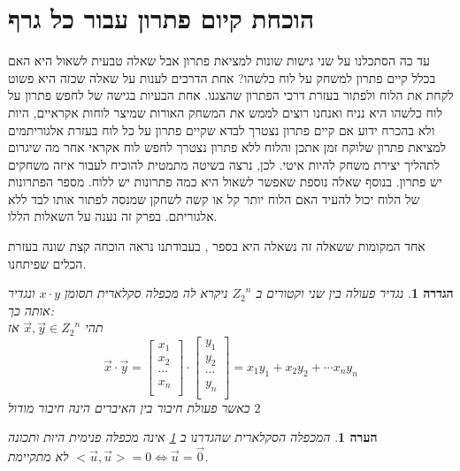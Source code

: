 \documentclass[12pt,twoside]{article}
\newtheorem{definition}{הגדרה}[section]
\newtheorem{comm}{הערה}[section]
\newcommand{\Zn}{{Z_2}^n}
\begin{document}
\section{הוכחת  קיום פתרון עבור כל גרף}
עד כה הסתכלנו על שני גישות שונות למציאת פתרון
אבל שאלה טבעית לשאול היא האם בכלל קיים פתרון למשחק על לוח כלשהו?
אחת הדרכים לענות על שאלה שכזה היא פשוט לקחת את הלוח ולפתור בעזרת 
דרכי הפתרון שהצגנו.
אחת הבעיות בגישה של לחפש פתרון על לוח כלשהו היא 
נניח ואנחנו רוצים לממש את המשחק האורות שמיצר לוחות אקראיים, היות ולא בהכרח ידוע אם קיים פתרון 
נצטרך לבדא שקיים פתרון על כל לוח בעזרת אלגוריתמים למציאת פתרון שלוקח זמן 
אתכן והלוח ללא פתרון נצטרך לחפש לוח אקראי אחר
מה שיגרום לתהליך יצירת משחק להיות איטי.
לכן, נרצה בשיטה מתמטית להוכיח לעבור איזה משחקים יש פתרון.
בנוסף שאלה נוספת שאפשר לשאול היא כמה פתרונות יש ללוח.
מספר הפתרונות של הלוח יכול להעיד האם הלוח יותר קל או קשה לשחקן שמנסה לפתור אותו
לבד ללא אלגוריתם.
בפרק זה נענה על השאלות הללו.

אחד המקומות ששאלה זה נשאלה היא בספר 
\cite{B3},
בעבודתנו נראה הוכחה קצת שונה בעזרת הכלים שפיתחנו.

\begin{definition}
    \label{def:inner_mul}
    נגדיר פעולה 
    בין שני וקטורים ב
    $\Zn$
    ניקרא לה מכפלה סקלארית
    תסומן 
    $x \cdot y$
    ונגדיר אותה כך:
    \\
    תהי 
    $\vec{x}, \vec{y} \in \Zn$
    אז 
    \[
        \vec{x} \cdot \vec{y} = 
        \begin{bmatrix}
            x_1 \\
            x_2 \\
            \cdots \\
            x_n \\
        \end{bmatrix}
        \cdot 
        \begin{bmatrix}
            y_1 \\
            y_2 \\
            \cdots \\
            y_n \\
        \end{bmatrix}
        = 
        x_1 y_1 + x_2 y_2 + \cdots x_n y_n
    \]
    כאשר 
    פעולת חיבור בין האיברים 
    הינה 
    חיבור מודול
    $2$
\end{definition}

\begin{comm}
    \label{comm:not_really_inner_mul}
    המכפלה הסקלארית שהגדרנו ב
    \ref{def:inner_mul}
    אינה מכפלה פנימית היות ותכונה 
    $<\vec{u},\vec{u}> = 0 \Leftrightarrow \vec{u} = \vec{0} $
    לא מתקיימת.
\end{comm}
\end{document}
